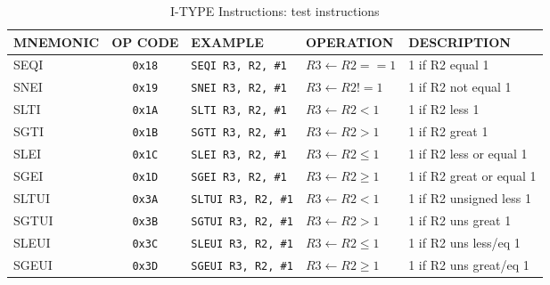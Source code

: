 \begin{table}[H]
\begin{tabularx}{\textwidth}{|l|c|l|l|X|}
    \hline
    MNEMONIC & OP CODE & EXAMPLE & OPERATION & DESCRIPTION \\ 
    \hline
    SEQI & \texttt{0x18} & \texttt{SEQI R3, R2, \#1} & $R3 \leftarrow R2 == 1$ & 1 if R2 equal 1\\ 
    \hline
    SNEI & \texttt{0x19} & \texttt{SNEI R3, R2, \#1} & $R3 \leftarrow R2 != 1$ & 1 if R2 not equal 1\\ 
    \hline
    SLTI & \texttt{0x1A} & \texttt{SLTI R3, R2, \#1} & $R3 \leftarrow R2 < 1$ & 1 if R2 less 1\\ 
    \hline
    SGTI & \texttt{0x1B} & \texttt{SGTI R3, R2, \#1} & $R3 \leftarrow R2 > 1$ & 1 if R2 great 1\\ 
    \hline
    SLEI & \texttt{0x1C} & \texttt{SLEI R3, R2, \#1} & $R3 \leftarrow R2 \leq 1$ & 1 if R2 less or equal 1\\ 
    \hline
    SGEI & \texttt{0x1D} & \texttt{SGEI R3, R2, \#1} & $R3 \leftarrow R2 \geq 1$ & 1 if R2 great or equal 1\\ 
    \hline
    SLTUI & \texttt{0x3A} & \texttt{SLTUI R3, R2, \#1} & $R3 \leftarrow R2 < 1$ & 1 if R2 unsigned less 1\\ 
    \hline
    SGTUI & \texttt{0x3B} & \texttt{SGTUI R3, R2, \#1} & $R3 \leftarrow R2 > 1$ & 1 if R2 uns great 1\\ 
    \hline
    SLEUI & \texttt{0x3C} & \texttt{SLEUI R3, R2, \#1} & $R3 \leftarrow R2 \leq 1$ & 1 if R2 uns less/eq 1\\ 
    \hline
    SGEUI & \texttt{0x3D} & \texttt{SGEUI R3, R2, \#1} & $R3 \leftarrow R2 \geq 1$ & 1 if R2 uns great/eq 1\\ 
    \hline
\end{tabularx}
\caption{I-TYPE Instructions: test instructions}
\label{table:i_type_test}
\end{table}


